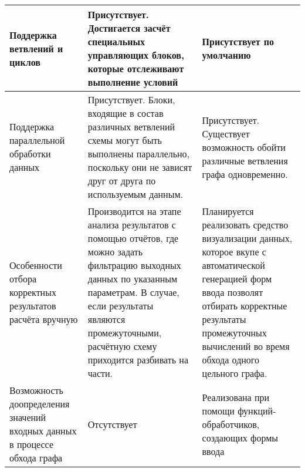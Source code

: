 \begin{longtable}{|p{3.5cm}|p{6.625cm}|p{6.625cm}|}
    \hline
    Поддержка ветвлений и циклов & Присутствует. Достигается засчёт специальных управляющих блоков, которые отслеживают выполнение условий & Присутствует по умолчанию\\
    \hline
    Поддержка параллельной обработки данных & Присутствует. Блоки, входящие в состав различных ветвлений схемы могут быть выполнены параллельно, поскольку они не зависят друг от друга по используемым данным. & Присутствует. Существует возможность обойти различные ветвления графа одновременно.\\
    \hline
    Особенности отбора корректных результатов расчёта вручную & Производится на этапе анализа результатов с помощью отчётов, где можно задать фильтрацию выходных данных по указанным параметрам. В случае, если результаты являются промежуточными, расчётную схему приходится разбивать на части. & Планируется реализовать средство визуализации данных, которое вкупе с автоматической генерацией форм ввода позволят отбирать корректные результаты промежуточных вычислений во время обхода одного цельного графа. \\
    \hline
    Возможность доопределения значений входных данных в процессе обхода графа & Отсутствует & Реализована при помощи функций-обработчиков, создающих формы ввода \\
    \hline
\end{longtable}
